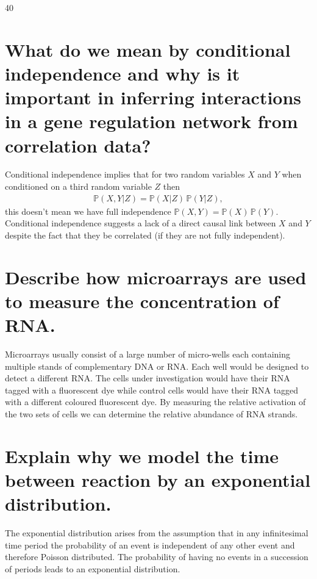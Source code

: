 \documentclass{uosexam2021}    %
\newcommand{\Prob}[1]{\mathbb{P}\left(#1\right)}
\newcommand{\mpos}[1]{}
\newcommand{\lines}[1]{}
\newcommand{\addspc}{}
\begin{document}
\begin{question}{40}
\begin{parts}
    \part[5]{What do we mean by conditional independence and why is
      it important in inferring interactions in a gene regulation
      network from correlation data?}{\lines{6}}
    \begin{answer}
      Conditional independence implies that for two random variables
      $X$ and $Y$ when conditioned on a third random variable $Z$ then
      \begin{align*}
        \Prob{X,Y|Z} = \Prob{X|Z}\,\Prob{Y|Z},
      \end{align*}
      this doesn't mean we have full independence $\Prob{X,Y} =
      \Prob{X}\,\Prob{Y}$.  Conditional independence suggests a lack
      of a direct causal link between $X$ and $Y$ despite the fact
      that they be correlated (if they are not fully independent).
    \end{answer}\mpos{3cm}
    \part[5]{Describe how microarrays are used to measure the
      concentration of RNA.\\}{\lines{6}}
    \begin{answer}
      Microarrays usually consist of a large number of micro-wells
      each containing multiple stands of complementary DNA or RNA.
      Each well would be designed to detect a different RNA.  The
      cells under investigation would have their RNA tagged with a
      fluorescent dye while control cells would have their RNA tagged
      with a different coloured fluorescent dye.  By measuring the
      relative activation of the two sets of cells we can determine the
      relative abundance of RNA strands.
    \end{answer}\mpos{3cm}
    \part[5]{Explain why we model the time between reaction by an
      exponential distribution.}{\lines{6}}
    \begin{answer}
      The exponential distribution arises from the assumption that in
      any infinitesimal time period the probability of an event is
      independent of any other event and therefore Poisson
      distributed.  The probability of having no events in a
      succession of periods leads to an exponential distribution.
    \end{answer}\mpos{3cm}
    \clearpage
     \addspc
    \mpos{8cm}

\end{parts}
\end{question}
\end{document}

